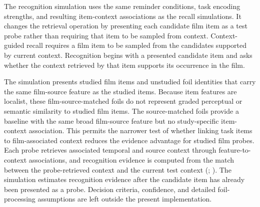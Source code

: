 \documentclass[
  man,
  floatsintext,
  longtable,
  nolmodern,
  notxfonts,
  notimes,
  draftfirst,
  colorlinks=true,linkcolor=blue,citecolor=blue,urlcolor=blue]{apa7}
\begin{document}
The recognition simulation uses the same reminder conditions, task
encoding strengths, and resulting item-context associations as the
recall simulations. It changes the retrieval operation by presenting
each candidate film item as a test probe rather than requiring that item
to be sampled from context. Context-guided recall requires a film item
to be sampled from the candidates supported by current context.
Recognition begins with a presented candidate item and asks whether the
context retrieved by that item supports its occurrence in the film.

The simulation presents studied film items and unstudied foil identities
that carry the same film-source feature as the studied items. Because
item features are localist, these film-source-matched foils do not
represent graded perceptual or semantic similarity to studied film
items. The source-matched foils provide a baseline with the same broad
film-source feature but no study-specific item-context association. This
permits the narrower test of whether linking task items to
film-associated context reduces the evidence advantage for studied film
probes. Each probe retrieves associated temporal and source context
through feature-to-context associations, and recognition evidence is
computed from the match between the probe-retrieved context and the
current test context (; ). The simulation
estimates recognition evidence after the candidate item has already been
presented as a probe. Decision criteria, confidence, and detailed
foil-processing assumptions are left outside the present implementation.
\end{document}
